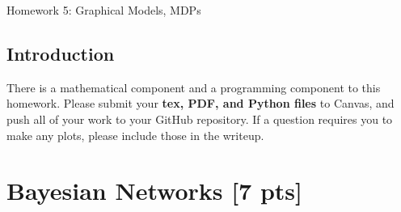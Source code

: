 \documentclass[submit]{harvardml}
\begin{document}
\begin{center}
{\Large Homework 5: Graphical Models, MDPs}\\
\end{center}

\subsection*{Introduction}

There is a mathematical component and a programming component to this homework.
Please submit your \textbf{tex, PDF, and Python files} to Canvas, and push all
of your work to your GitHub repository. If a question requires you to make any
plots, please include those in the writeup.

\newpage

\section*{Bayesian Networks [7 pts]}
\end{document}
